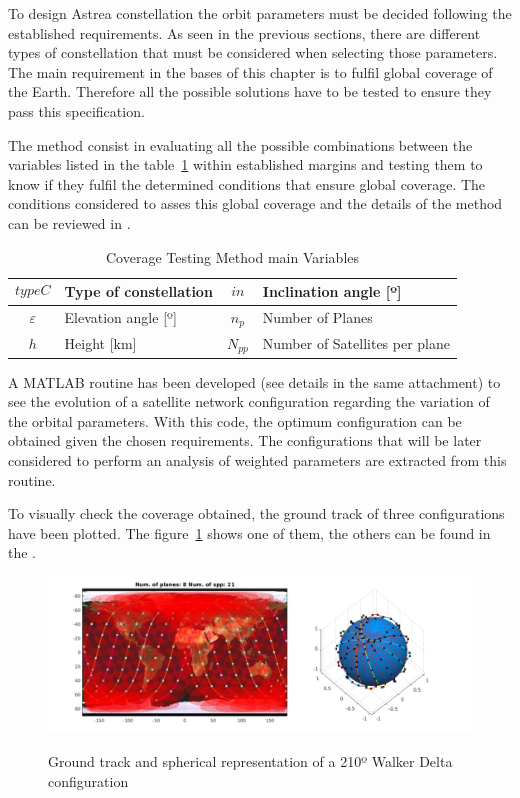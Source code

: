 
To design Astrea constellation the orbit parameters must be decided following the established requirements. As seen in the previous sections, there are different types of constellation that must be considered when selecting those parameters. The main requirement in the bases of this chapter is to fulfil global coverage of the Earth. Therefore all the possible solutions have to be tested to ensure they pass this specification.

The method consist in evaluating all the possible combinations between the variables listed in the table~\ref{t:CovVar} within established margins and testing them to know if they fulfil the determined conditions that ensure global coverage. The conditions considered to asses this global coverage and the details of the method can be reviewed in \cite[Chapter 3, Section 5]{annex1}. %

\begin{table}[H]
\centering
\begin{tabular}{|c|l|c|l|}
\hline
$$typeC$$     & Type of constellation    & $$in$$  & Inclination angle {[}º{]} \\ \hline
$\varepsilon$ & Elevation angle {[}º{]}  & $n_{p}$ & Number of Planes                          \\ \hline
$$h$$         & Height  {[}km{]}  & $N_{pp}$ & Number of Satellites per plane            \\ \hline
\end{tabular}
\caption{Coverage Testing Method main Variables}
\label{t:CovVar}
\end{table}  

A MATLAB routine has been developed (see details in the same attachment) to see the evolution of a satellite network configuration regarding the variation of the orbital parameters. With this code, the optimum configuration can be obtained given the chosen requirements. The configurations that will be later considered to perform an analysis of weighted parameters are extracted from this routine.

To visually check the coverage obtained, the ground track of three configurations have been plotted. The figure~\ref{fig:gt210} shows one of them, the others can be found in the \cite[Chapter 3, Section 5]{annex1}. 

\begin{figure}[H] %
	\centering
	\includegraphics[width=.8\textwidth]{./testing/WB210.png}\\
	\caption[Ground track and spherical representation of a 210º Walker Delta]{Ground track and spherical representation of a 210º Walker Delta configuration}
	\label{fig:gt210}
\end{figure}